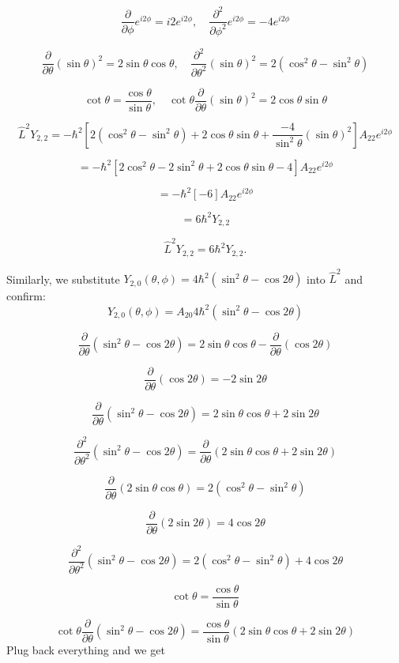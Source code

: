 \documentclass[letter, 10pts]{article}
\newcommand{\hb}{\hbar}
\begin{document}
\[
\frac{\partial}{\partial\phi} e^{i2\phi} = i2 e^{i2\phi}, \quad \frac{\partial^2}{\partial\phi^2} e^{i2\phi} = -4 e^{i2\phi}
\]

\[
\frac{\partial}{\partial\theta} (\sin\theta)^2 = 2\sin\theta\cos\theta, \quad \frac{\partial^2}{\partial\theta^2} (\sin\theta)^2 = 2(\cos^2\theta - \sin^2\theta)
\]

\[
\cot\theta = \frac{\cos\theta}{\sin\theta}, \quad \cot\theta \frac{\partial}{\partial\theta} (\sin\theta)^2 = 2\cos\theta\sin\theta
\]

\[
\hat{L}^2 Y_{2,2} = -\hbar^2 \left[2(\cos^2\theta - \sin^2\theta) + 2\cos\theta\sin\theta + \frac{-4}{\sin^2\theta}(\sin\theta)^2\right] A_{22} e^{i2\phi}
\]

\[
= -\hbar^2 \left[2\cos^2\theta - 2\sin^2\theta + 2\cos\theta\sin\theta - 4\right] A_{22} e^{i2\phi}
\]

\[
= -\hbar^2 \left[-6\right] A_{22} e^{i2\phi}
\]

\[
= 6\hbar^2 Y_{2,2}
\]

   \[
   \hat{L}^2 Y_{2,2} = 6\hbar^2 Y_{2,2}.
   \]

Similarly, we substitute \( Y_{2,0}(\theta, \phi) = 4\hb^2(\sin ^2 \theta - \cos 2 \theta) \) into \( \hat{L}^2 \) and confirm:
\[
Y_{2,0}(\theta, \phi) = A_{20} 4 \hbar^2 (\sin^2\theta - \cos 2\theta)
\]

\[
\frac{\partial}{\partial\theta}(\sin^2\theta - \cos 2\theta) = 2\sin\theta\cos\theta - \frac{\partial}{\partial\theta}(\cos 2\theta)
\]

\[
\frac{\partial}{\partial\theta}(\cos 2\theta) = -2\sin 2\theta
\]

\[
\frac{\partial}{\partial\theta}(\sin^2\theta - \cos 2\theta) = 2\sin\theta\cos\theta + 2\sin 2\theta
\]

\[
\frac{\partial^2}{\partial\theta^2}(\sin^2\theta - \cos 2\theta) = \frac{\partial}{\partial\theta}(2\sin\theta\cos\theta + 2\sin 2\theta)
\]

\[
\frac{\partial}{\partial\theta}(2\sin\theta\cos\theta) = 2(\cos^2\theta - \sin^2\theta)
\]

\[
\frac{\partial}{\partial\theta}(2\sin 2\theta) = 4\cos 2\theta
\]

\[
\frac{\partial^2}{\partial\theta^2}(\sin^2\theta - \cos 2\theta) = 2(\cos^2\theta - \sin^2\theta) + 4\cos 2\theta
\]

\[
\cot\theta = \frac{\cos\theta}{\sin\theta}
\]

\[
\cot\theta \frac{\partial}{\partial\theta}(\sin^2\theta - \cos 2\theta) = \frac{\cos\theta}{\sin\theta}(2\sin\theta\cos\theta + 2\sin 2\theta)
\]
Plug back everything and we get
\end{document}
